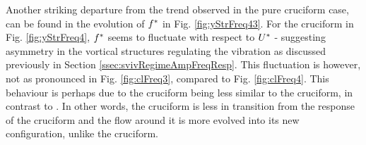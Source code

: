 \documentclass[oneside]{utmthesis}
\begin{document}
Another striking departure from the trend observed in the pure cruciform case, can be found in the evolution of $f^{*}$ in Fig. \ref{fig:yStrFreq43}. For the \angfo{} cruciform in Fig. \ref{fig:yStrFreq4}, $f^{*}$ seems to fluctuate with respect to $U^{*}$ - suggesting asymmetry in the vortical structures regulating the vibration as discussed previously in Section \ref{ssec:svivRegimeAmpFreqResp}. This fluctuation is however, not as pronounced in Fig. \ref{fig:clFreq3}, compared to Fig. \ref{fig:clFreq4}. This behaviour is perhaps due to the \angth{} cruciform being less similar to the \angfi{} cruciform, in contrast to \angfo{}. In other words, the \angth{} cruciform is less in transition from the response of the \angfi{} cruciform and the flow around it is more evolved into its new configuration, unlike the \angfo{} cruciform.
\end{document}
